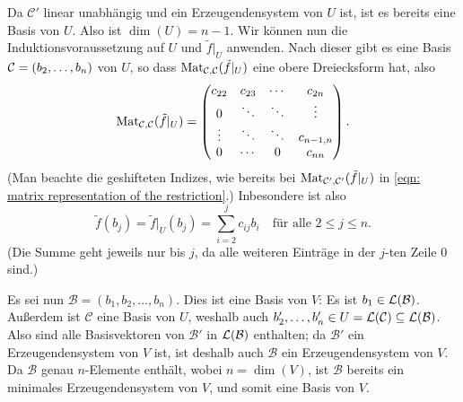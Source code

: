 \documentclass[a4paper,10pt]{scrartcl}
\begin{document}
Da $\mathcal{C'}$ linear unabhängig und ein Erzeugendensystem von $U$ ist, ist es bereits eine Basis von $U$. Also ist $\dim(U) = n-1$. Wir können nun die Induktionsvoraussetzung auf $U$ und $\tilde{f}|_U$ anwenden. Nach dieser gibt es eine Basis $\mathcal{C} = (b_2, \dotsc, b_n)$ von $U$, so dass $\mathrm{Mat}_{\mathcal{C},\mathcal{C}}(\tilde{f}|_U)$ eine obere Dreiecksform hat, also
\[
 \mathrm{Mat}_{\mathcal{C},\mathcal{C}}(\tilde{f}|_U)
 =
 \begin{pmatrix}
  c_{22} & c_{23} & \cdots & c_{2n}    \\
  0      & \ddots & \ddots & \vdots    \\
  \vdots & \ddots & \ddots & c_{n-1,n} \\
  0      & \cdots & 0      & c_{nn}
 \end{pmatrix}.
\]
(Man beachte die geshifteten Indizes, wie bereits bei $\mathrm{Mat}_{\mathcal{C}',\mathcal{C}'}(\tilde{f}|_U)$ in \eqref{eqn: matrix representation of the restriction}.) Inbesondere ist also
\[
 \tilde{f}(b_j)
 = \tilde{f}|_U(b_j)
 = \sum_{i=2}^j c_{ij} b_i
 \quad\text{für alle $2 \leq j \leq n$}.
\]
(Die Summe geht jeweils nur bis $j$, da alle weiteren Einträge in der $j$-ten Zeile $0$ sind.)

Es sei nun $\mathcal{B} = (b_1, b_2, \dotsc, b_n)$. Dies ist eine Basis von $V$: Es ist $b_1 \in \mathcal{L}(\mathcal{B})$. Außerdem ist $\mathcal{C}$ eine Basis von $U$, weshalb auch $b'_2, \dotsc, b'_n \in U = \mathcal{L}(\mathcal{C}) \subseteq \mathcal{L}(\mathcal{B})$. Also sind alle Basisvektoren von $\mathcal{B}'$ in $\mathcal{L}(\mathcal{B})$ enthalten; da $\mathcal{B}'$ ein Erzeugendensystem von $V$ ist, ist deshalb auch $\mathcal{B}$ ein Erzeugendensystem von $V$. Da $\mathcal{B}$ genau $n$-Elemente enthält, wobei $n = \dim(V)$, ist $\mathcal{B}$ bereits ein minimales Erzeugendensystem von $V$, und somit eine Basis von $V$.
\end{document}
